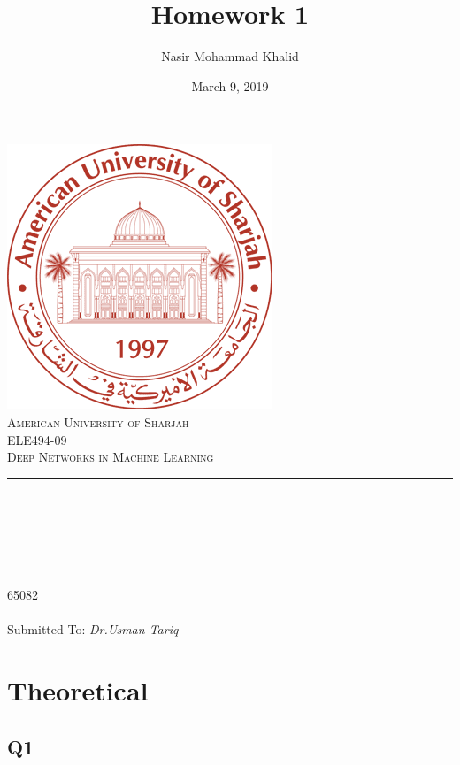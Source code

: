 \documentclass[a4paper, 12pt]{article}
\title{Homework 1}
\author{Nasir Mohammad Khalid}
\date{March 9, 2019}
\makeatletter
\let\thetitle\@title
\let\theauthor\@author
\let\thedate\@date
\makeatother
\begin{document}
 
    \begin{titlepage}
        \centering
        \vspace*{0.5 cm}
        \includegraphics[scale = 0.60]{logo.png}\\[1.0 cm]	%
        \textsc{\LARGE American University of Sharjah}\\[1.0 cm]
        \textsc{\Large ELE494-09}\\[0.2 cm]	
        \textsc{\Large Deep Networks in Machine Learning}\\[0.5 cm]			%
        \rule{\linewidth}{0.2 mm} \\[0.4 cm]
        { \huge \bfseries \thetitle}\\
        \rule{\linewidth}{0.2 mm} \\[1.5 cm]
        
        \textsc{\Large{\theauthor}}\\[0.3 cm]
        \textsc{\Large{65082}}\\[0.3 cm]
        \textsc{\Large{\thedate}}\\[1.5 cm]

        \textmd{Submitted To: \itshape{Dr.Usman Tariq}}
    \end{titlepage}

    \clearpage
    \tableofcontents
    \listoffigures
    \lstlistoflistings
    \clearpage

    \section{Theoretical}

    \subsection{Q1}
\end{document}
